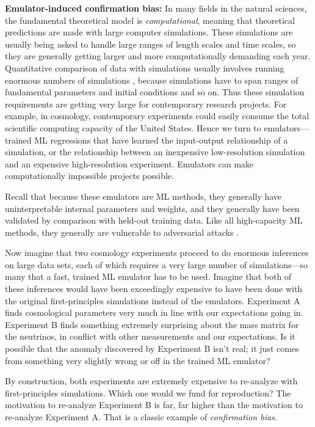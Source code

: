 \documentclass{article}
\renewcommand{\paragraph}[1]{\noindent\par\textbf{#1}}
\begin{document}
\paragraph{Emulator-induced confirmation bias:}
In many fields in the natural sciences, the fundamental theoretical model is \emph{computational}, meaning that theoretical predictions are made with large computer simulations.
These simulations are usually being asked to handle large ranges of length scales and time scales, so they are generally getting larger and more computationally demanding each year.
Quantitative comparison of data with simulations usually involves running enormous numbers of simulations \cite{abc}, because simulations have to span ranges of fundamental parameters and initial conditions and so on.
Thus these simulation requirements are getting very large for contemporary research projects.
For example, in cosmology, contemporary experiments could easily consume the total scientific computing capacity of the United States.
Hence we turn to emulators---trained ML regressions that have learned the input-output relationship of a simulation, or the relationship between an inexpensive low-resolution simulation and an expensive high-resolution experiment.
Emulators can make computationally impossible projects possible.

Recall that because these emulators are ML methods, they generally have uninterpretable internal parameters and weights, and they generally have been validated by comparison with held-out training data.
Like all high-capacity ML methods, they generally are vulnerable to adversarial attacks \cite{adversarial1}.

Now imagine that two cosmology experiments proceed to do enormous inferences on large data sets, each of which requires a very large number of simulations---so many that a fast, trained ML emulator has to be used.
Imagine that both of these inferences would have been exceedingly expensive to have been done with the original first-principles simulations instead of the emulators.
Experiment A finds cosmological parameters very much in line with our expectations going in.
Experiment B finds something extremely surprising about the mass matrix for the neutrinos, in conflict with other measurements and our expectations.
Is it possible that the anomaly discovered by Experiment B isn't real; it just comes from something very slightly wrong or off in the trained ML emulator?

By construction, both experiments are extremely expensive to re-analyze with first-principles simulations.
Which one would we fund for reproduction?
The motivation to re-analyze Experiment B is far, far higher than the motivation to re-analyze Experiment A.
That is a classic example of \emph{confirmation bias}.
\end{document}
